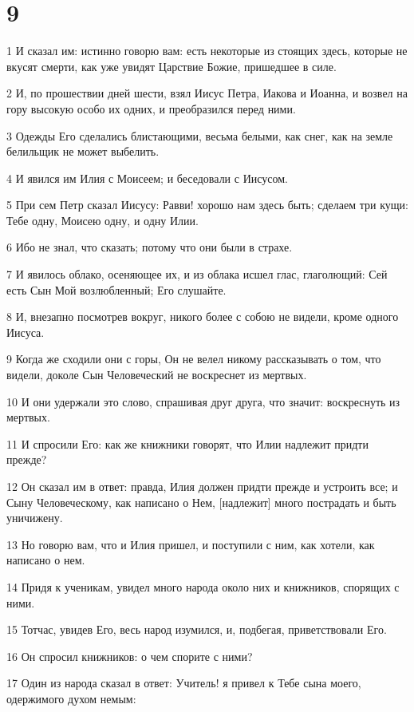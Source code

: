 \chapter{9}

\par 1 И сказал им: истинно говорю вам: есть некоторые из стоящих здесь, которые не вкусят смерти, как уже увидят Царствие Божие, пришедшее в силе.
\par 2 И, по прошествии дней шести, взял Иисус Петра, Иакова и Иоанна, и возвел на гору высокую особо их одних, и преобразился перед ними.
\par 3 Одежды Его сделались блистающими, весьма белыми, как снег, как на земле белильщик не может выбелить.
\par 4 И явился им Илия с Моисеем; и беседовали с Иисусом.
\par 5 При сем Петр сказал Иисусу: Равви! хорошо нам здесь быть; сделаем три кущи: Тебе одну, Моисею одну, и одну Илии.
\par 6 Ибо не знал, что сказать; потому что они были в страхе.
\par 7 И явилось облако, осеняющее их, и из облака исшел глас, глаголющий: Сей есть Сын Мой возлюбленный; Его слушайте.
\par 8 И, внезапно посмотрев вокруг, никого более с собою не видели, кроме одного Иисуса.
\par 9 Когда же сходили они с горы, Он не велел никому рассказывать о том, что видели, доколе Сын Человеческий не воскреснет из мертвых.
\par 10 И они удержали это слово, спрашивая друг друга, что значит: воскреснуть из мертвых.
\par 11 И спросили Его: как же книжники говорят, что Илии надлежит придти прежде?
\par 12 Он сказал им в ответ: правда, Илия должен придти прежде и устроить все; и Сыну Человеческому, как написано о Нем, [надлежит] много пострадать и быть уничижену.
\par 13 Но говорю вам, что и Илия пришел, и поступили с ним, как хотели, как написано о нем.
\par 14 Придя к ученикам, увидел много народа около них и книжников, спорящих с ними.
\par 15 Тотчас, увидев Его, весь народ изумился, и, подбегая, приветствовали Его.
\par 16 Он спросил книжников: о чем спорите с ними?
\par 17 Один из народа сказал в ответ: Учитель! я привел к Тебе сына моего, одержимого духом немым:
